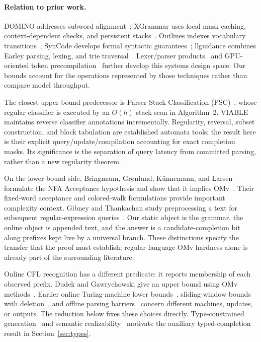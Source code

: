 \documentclass[manuscript,screen,11pt,nonacm]{acmart}
\theoremstyle{definition}\newtheorem{definition}{Definition}
\begin{document}
\paragraph{Relation to prior work.}
DOMINO addresses subword alignment~\cite{pmlr-v235-beurer-kellner24a}; XGrammar uses local mask caching, context-dependent checks, and persistent stacks~\cite{MLSYS2025_5c20ca4b}. Outlines indexes vocabulary transitions~\cite{willard2023efficientguidedgenerationlarge}; SynCode develops formal syntactic guarantees~\cite{ugare2025syncode}; llguidance combines Earley parsing, lexing, and trie traversal~\cite{llguidance}. Lexer/parser products~\cite{pmlr-v267-park25l} and GPU-oriented token precompilation~\cite{pmlr-v306-hua26b} further develop this systems design space. Our bounds account for the operations represented by those techniques rather than compare model throughput.

The closest upper-bound predecessor is Parser Stack Classification (PSC)~\cite{li2026efficientgrammarconstraineddecodingparser}, whose regular classifier is executed by an $O(h)$ stack scan in Algorithm~2. VIABLE maintains reverse classifier annotations incrementally. Regularity, reversal, subset construction, and block tabulation are established automata tools; the result here is their explicit query/update/compilation accounting for exact completion masks. Its significance is the separation of query latency from committed parsing, rather than a new regularity theorem.

On the lower-bound side, Bringmann, Gr\o nlund, K\"unnemann, and Larsen formulate the NFA Acceptance hypothesis and show that it implies OMv~\cite{theoretics:13000}. Their fixed-word acceptance and colored-walk formulations provide important complexity context. Gibney and Thankachan study preprocessing a text for subsequent regular-expression queries~\cite{Gibney_2021}. Our static object is the grammar, the online object is appended text, and the answer is a candidate-completion bit along prefixes kept live by a universal branch. These distinctions specify the transfer that the proof must establish; regular-language OMv hardness alone is already part of the surrounding literature.

Online CFL recognition has a different predicate: it reports membership of each observed prefix. Dudek and Gawrychowski give an upper bound using OMv methods~\cite{dudek_et_al:LIPIcs.CPM.2024.13}. Earlier online Turing-machine lower bounds~\cite{Gallaire_1969}, sliding-window bounds with deletion~\cite{ganardi_et_al:LIPIcs.FSTTCS.2022.38}, and offline parsing barriers~\cite{Lee:02a,Abboud_2015} concern different machines, updates, or outputs. The reduction below fixes these choices directly. Type-constrained generation~\cite{M_ndler_2025} and semantic realizability~\cite{Nagy_2026} motivate the auxiliary typed-completion result in Section~\ref{sec:types}.
\end{document}
